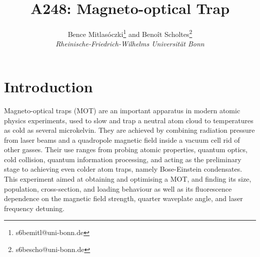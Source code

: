 \documentclass[twocolumn]{article}
\title{\textbf{A248: Magneto-optical Trap}}
\author{Bence Mitlasóczki\thanks{s6bemitl@uni-bonn.de} and Beno\^it Scholtes\thanks{s6bescho@uni-bonn.de} \\ \textit{Rheinische-Friedrich-Wilhelms Universit\"at Bonn}}
\begin{document}
\renewcommand{\abstractname}{\vspace{-\baselineskip}} %
\twocolumn[ %
\begin{@twocolumnfalse}
\maketitle

\begin{abstract} \vspace{-10mm}
This paper characterises an optimised magneto-optical trap of $^{85}\ce{Rb}$ gas, obtained with a 780~nm laser, natural Rubidium gas in a vacuum chamber, and a magnetic field produced by coils in an anti-Helmholtz configuration. A MOT with a volume of $(8.09 \pm 0.52)\text{mm}^3$ and $(10.1 \pm 2.1)\cdot 10^6$ atoms was obtained. It had a loading time of $(0.268 \pm 0.006) \, \text{s}$ and a Rb-Rb cross-section of $(6.36 \pm 0.13) \cdot 10^{-18} \, \text{m}^2$. The optimal red detunings of the cooling and repumping lasers were determined to be $(11.4 \pm 1.4) \, \text{MHz}$ from the F=3 $\to$ F'=4 transition and $(5.53 \pm 0.90)\, \text{MHz}$ from the F=2 $\to$ F'=3 transition, respectively. The obtained results are in good agreement with theory and past experiments though more precise results could have been obtained from a more luminous and stable MOT.
\end{abstract}
\end{@twocolumnfalse}
\hspace{5mm} ]
\maketitle
\saythanks %
\section{Introduction}
Magneto-optical traps (MOT) are an important apparatus in modern atomic physics experiments, used to slow and trap a neutral atom cloud to temperatures as cold as several microkelvin. They are achieved by combining radiation pressure from laser beams and a quadropole magnetic field inside a vacuum cell rid of other gasses. Their use ranges from probing atomic properties, quantum optics, cold collision, quantum information processing, and acting as the preliminary stage to achieving even colder atom traps, namely Bose-Einstein condensates. This experiment aimed at obtaining and optimising a MOT, and finding its size, population, cross-section, and loading behaviour as well as its fluorescence dependence on the magnetic field strength, quarter waveplate angle, and laser frequency detuning.
\end{document}
